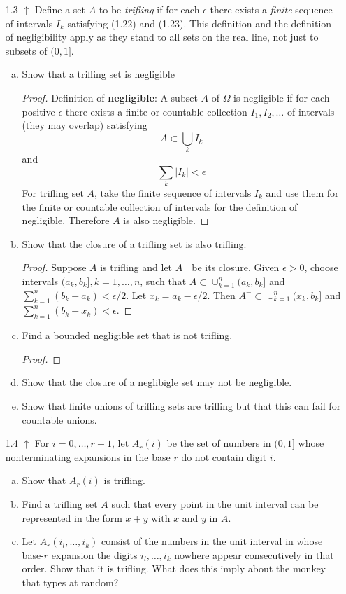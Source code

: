 \documentclass[letterpaper, 12pt]{article}
\begin{document}
\begin{enumerate}
\item[1.3]
$\uparrow$ Define a set $A$ to be \textit{trifling} if for each $\epsilon$ there exists a \textit{finite} sequence of intervals $I_k$ satisfying (1.22) and (1.23). This definition and the definition of negligibility apply as they stand to all sets on the real line, not just to subsets of $(0,1]$.
\begin{enumerate}[(a)]
\item
Show that a trifling set is negligible
\begin{proof}
Definition of \textbf{negligible}: A subset $A$ of $\Omega$ is negligible if for each positive $\epsilon$ there exists a finite or countable collection $I_1, I_2, \dots$ of intervals (they may overlap) satisfying
\begin{equation}
A \subset \bigcup_k I_k
\end{equation}
and 
\begin{equation}
\sum_k |I_k| < \epsilon
\end{equation}
For trifling set $A$, take the finite sequence of intervals $I_k$ and use them for the finite or countable collection of intervals for the definition of negligible. Therefore $A$ is also negligible.
\end{proof}
\item
Show that the closure of a trifling set is also trifling.
\begin{proof}
Suppose $A$ is trifling and let $A^-$ be its closure. Given $\epsilon > 0$, choose intervals $(a_k, b_k], k=1,\dots,n$, such that $A \subset \cup_{k=1}^n (a_k, b_k]$ and $\sum_{k=1}^n (b_k - a_k) < \epsilon/2$. Let $x_k = a_k - \epsilon/2$. Then $A^- \subset \cup_{k=1}^n (x_k, b_k]$ and $\sum_{k=1}^n (b_k - x_k) < \epsilon$.
\end{proof}
\item
Find a bounded negligible set that is not trifling.
\begin{proof}

\end{proof}
\item
Show that the closure of a neglibigle set may not be negligible.
\item
Show that finite unions of trifling sets are trifling but that this can fail for countable unions.
\end{enumerate}

\item[1.4]
$\uparrow$ For $i = 0, \dots, r-1$, let $A_r(i)$ be the set of numbers in $(0,1]$ whose nonterminating expansions in the base $r$ do not contain digit $i$.
\begin{enumerate}[(a)]
\item
Show that $A_r(i)$ is trifling.
\item
Find a trifling set $A$ such that every point in the unit interval can be represented in the form $x+y$ with $x$ and $y$ in $A$.
\item
Let $A_r(i_l, \dots, i_k)$ consist of the numbers in the unit interval in whose base-$r$ expansion the digits $i_l, \dots, i_k$ nowhere appear consecutively in that order. Show that it is trifling. What does this imply about the monkey that types at random?
\end{enumerate}


\end{enumerate}
\end{document}
